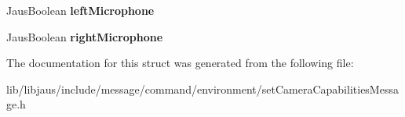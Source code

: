 \begin{DoxyCompactItemize}
\item 
\hypertarget{struct_set_camera_capabilities_message_struct_aac74a25cc5235ffbc3a7b4f83f56ddbd}{\-Jaus\-Boolean {\bfseries left\-Microphone}}\label{struct_set_camera_capabilities_message_struct_aac74a25cc5235ffbc3a7b4f83f56ddbd}

\item 
\hypertarget{struct_set_camera_capabilities_message_struct_aeaec3e29a79a4c98fb4d3b0efa8f0d65}{\-Jaus\-Boolean {\bfseries right\-Microphone}}\label{struct_set_camera_capabilities_message_struct_aeaec3e29a79a4c98fb4d3b0efa8f0d65}

\end{DoxyCompactItemize}


\-The documentation for this struct was generated from the following file\-:\begin{DoxyCompactItemize}
\item 
lib/libjaus/include/message/command/environment/set\-Camera\-Capabilities\-Message.\-h\end{DoxyCompactItemize}
